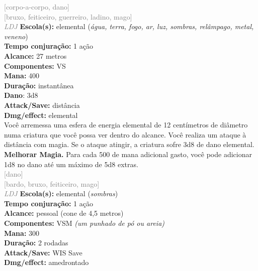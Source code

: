 \documentclass{RPG_Adventure}[2021/10/20]
\begin{document}
{\scriptsize \textcolor{gray}{[corpo-a-corpo, dano]\\}}
{\scriptsize \textcolor{gray}{[bruxo, feiticeiro, guerreiro, ladino, mago]\\}}
{\tiny \textcolor{gray}{\textit{LDJ}}}
{\small \t \textbf{Escola(s):} elemental (\textit{água, terra, fogo, ar, luz, sombras, relâmpago, metal, veneno})\\\t \textbf{Tempo conjuração:} 1 ação\\\t \textbf{Alcance:} 27 metros\\\t \textbf{Componentes:} VS\\\t \textbf{Mana:} 400\\\t \textbf{Duração:} instantânea\\\t \textbf{Dano}: 3d8\\\t \textbf{Attack/Save:} distância\\\t \textbf{Dmg/effect:} elemental\\}
{\normalsize Você arremessa uma esfera de energia elemental de 12 centímetros de diâmetro numa criatura que você possa ver dentro do alcance. Você realiza um ataque à distância com magia. Se o ataque atingir, a criatura sofre 3d8 de dano elemental. \textbf{Melhorar Magia.} Para cada 500 de mana adicional gasto, você pode adicionar 1d8 no dano até um máximo de 5d8 extras.\\}
{\scriptsize \textcolor{gray}{[dano]\\}}
{\scriptsize \textcolor{gray}{[bardo, bruxo, feiticeiro, mago]\\}}
{\tiny \textcolor{gray}{\textit{LDJ}}}
{\small \t \textbf{Escola(s):} elemental (\textit{sombras})\\\t \textbf{Tempo conjuração:} 1 ação\\\t \textbf{Alcance:} pessoal (cone de 4,5 metros)\\\t \textbf{Componentes:} VSM \textit{(um punhado de pó ou areia)}\\\t \textbf{Mana:} 300\\\t \textbf{Duração:} 2 rodadas\\\t \textbf{Attack/Save:} WIS Save\\\t \textbf{Dmg/effect:} amedrontado\\}
\end{document}
